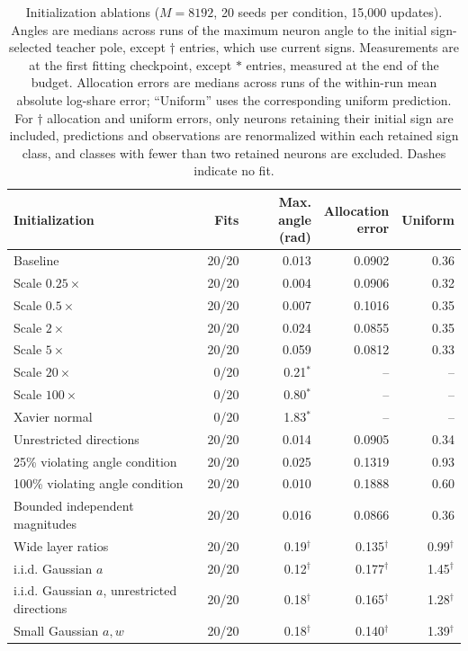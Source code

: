 \begin{table}[htbp]
\centering
\small
\setlength{\tabcolsep}{4pt}
\begin{tabular}{lrrrr}
\toprule
Initialization & Fits & \shortstack{Max. angle\\(rad)} & \shortstack{Allocation\\error} & Uniform \\
\midrule
Baseline & 20/20 & 0.013 & 0.0902 & 0.36 \\
Scale $0.25\times$ & 20/20 & 0.004 & 0.0906 & 0.32 \\
Scale $0.5\times$ & 20/20 & 0.007 & 0.1016 & 0.35 \\
Scale $2\times$ & 20/20 & 0.024 & 0.0855 & 0.35 \\
Scale $5\times$ & 20/20 & 0.059 & 0.0812 & 0.33 \\
Scale $20\times$ & 0/20 & 0.21$^{*}$ & -- & -- \\
Scale $100\times$ & 0/20 & 0.80$^{*}$ & -- & -- \\
Xavier normal & 0/20 & 1.83$^{*}$ & -- & -- \\
Unrestricted directions & 20/20 & 0.014 & 0.0905 & 0.34 \\
25\% violating angle condition & 20/20 & 0.025 & 0.1319 & 0.93 \\
100\% violating angle condition & 20/20 & 0.010 & 0.1888 & 0.60 \\
Bounded independent magnitudes & 20/20 & 0.016 & 0.0866 & 0.36 \\
Wide layer ratios & 20/20 & 0.19$^{\dagger}$ & 0.135$^{\dagger}$ & 0.99$^{\dagger}$ \\
i.i.d. Gaussian $a$ & 20/20 & 0.12$^{\dagger}$ & 0.177$^{\dagger}$ & 1.45$^{\dagger}$ \\
i.i.d. Gaussian $a$, unrestricted directions & 20/20 & 0.18$^{\dagger}$ & 0.165$^{\dagger}$ & 1.28$^{\dagger}$ \\
Small Gaussian $a,w$ & 20/20 & 0.18$^{\dagger}$ & 0.140$^{\dagger}$ & 1.39$^{\dagger}$ \\
\bottomrule
\end{tabular}
\caption{Initialization ablations ($M=8192$, 20 seeds per condition, 15,000 updates). Angles are medians across runs of the maximum neuron angle to the initial sign-selected teacher pole, except $\dagger$ entries, which use current signs. Measurements are at the first fitting checkpoint, except $*$ entries, measured at the end of the budget. Allocation errors are medians across runs of the within-run mean absolute log-share error; ``Uniform'' uses the corresponding uniform prediction. For $\dagger$ allocation and uniform errors, only neurons retaining their initial sign are included, predictions and observations are renormalized within each retained sign class, and classes with fewer than two retained neurons are excluded. Dashes indicate no fit.}
\label{tab:h-initialization}
\end{table}
